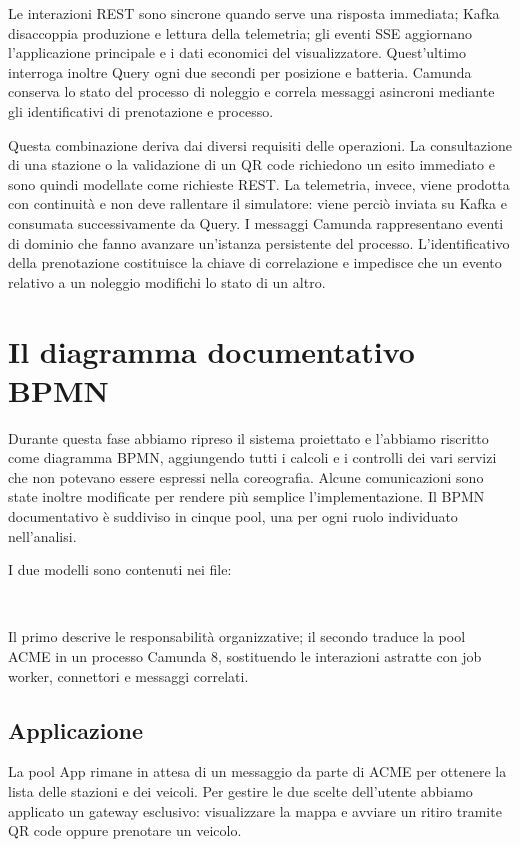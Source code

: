 \documentclass[12pt,a4paper,twoside]{report}
\newcommand{\capitoloNum}[1]{\chapter{#1}}
\begin{document}
Le interazioni REST sono sincrone quando serve una risposta immediata; Kafka
disaccoppia produzione e lettura della telemetria; gli eventi SSE aggiornano
l'applicazione principale e i dati economici del visualizzatore. Quest'ultimo
interroga inoltre Query ogni due secondi per posizione e batteria. Camunda
conserva lo stato del processo di noleggio e correla messaggi asincroni
mediante gli identificativi di prenotazione e processo.

Questa combinazione deriva dai diversi requisiti delle operazioni. La
consultazione di una stazione o la validazione di un QR code richiedono un
esito immediato e sono quindi modellate come richieste REST. La telemetria,
invece, viene prodotta con continuità e non deve rallentare il simulatore:
viene perciò inviata su Kafka e consumata successivamente da Query. I
messaggi Camunda rappresentano eventi di dominio che fanno avanzare
un'istanza persistente del processo. L'identificativo della prenotazione
costituisce la chiave di correlazione e impedisce che un evento relativo a un
noleggio modifichi lo stato di un altro.

\capitoloNum{Il diagramma documentativo BPMN}

Durante questa fase abbiamo ripreso il sistema proiettato e l'abbiamo
riscritto come diagramma BPMN, aggiungendo tutti i calcoli e i controlli dei
vari servizi che non potevano essere espressi nella coreografia. Alcune
comunicazioni sono state inoltre modificate per rendere più semplice
l'implementazione. Il BPMN documentativo è suddiviso in cinque pool, una per
ogni ruolo individuato nell'analisi.

I due modelli sono contenuti nei file:
\begin{center}
\small
{}\\
\end{center}
Il primo descrive le responsabilità organizzative; il secondo traduce la pool
ACME in un processo Camunda 8, sostituendo le interazioni astratte con job
worker, connettori e messaggi correlati.

\section{Applicazione}

La pool App rimane in attesa di un messaggio da parte di ACME per ottenere la
lista delle stazioni e dei veicoli. Per gestire le due scelte dell'utente
abbiamo applicato un gateway esclusivo: visualizzare la mappa e avviare un
ritiro tramite QR code oppure prenotare un veicolo.
\end{document}
